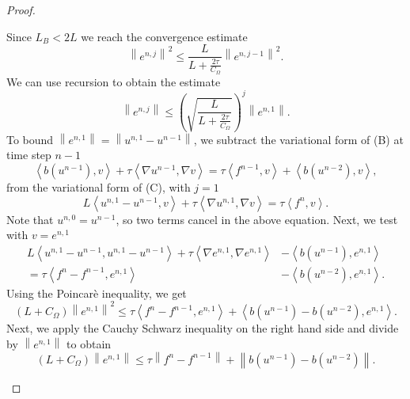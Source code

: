 \documentclass[../Main/main.tex]{subfiles}
\begin{document}
\begin{proof}
\begin{itemize}
		Since $L_B < 2L$ we reach the convergence estimate
		\begin{equation}
\left \|e^{n,j}\right \|^2 \leq \frac{L}{L+\frac{2\tau}{C_{\Omega}}}\left \|e^{n,j-1}\right \|^2.
		\end{equation}
		We can use recursion to obtain the estimate
		\begin{equation}\label{eq:recursion}
			\left \|e^{n,j}\right \| \leq \left(\sqrt{\frac{L}{L+\frac{2\tau}{C_{\Omega}}}} \right)^j  \left \|e^{n,1}\right \|.
		\end{equation}
		To bound $\left \|e^{n,1}\right \| = \left \|u^{n,1}-u^{n-1}\right \|$, we subtract the variational form of (B) at time step $n-1$
		\begin{equation}
			\left \langle b(u^{n-1}),v\right \rangle + \tau \left \langle \nabla u^{n-1},\nabla v \right \rangle =\tau \left \langle f^{n-1},v\right \rangle + \left \langle b(u^{n-2}),v\right\rangle,
		\end{equation}
		 from the variational form of (C), with $j=1$
		 \begin{equation}
		 	L\left \langle u^{n,1}-u^{n-1},v \right \rangle+\tau \left \langle \nabla u^{n,1},\nabla v \right\rangle = \tau\left \langle f^n,v\right\rangle.
		 \end{equation}
	 	Note that $u^{n,0}=u^{n-1}$, so two terms cancel in the above equation.
	  	Next, we test with $v=e^{n,1}$
		\begin{equation}
			\begin{aligned}
				L\left \langle u^{n,1}-u^{n-1},u^{n,1}-u^{n-1}\right \rangle + \tau \left \langle \nabla e^{n,1},\nabla e^{n,1}\right \rangle &- \left \langle b(u^{n-1}),e^{n,1}\right \rangle \\
				 =\tau \left \langle f^n-f^{n-1},e^{n,1}\right \rangle &- \left \langle b(u^{n-2}),e^{n,1}\right \rangle.
			\end{aligned}
			\end{equation}
		Using the Poincarè inequality, we get
		\begin{equation}
			(L+C_{\Omega})\left \|e^{n,1}\right \|^2 \leq \tau \left \langle f^n-f^{n-1},e^{n,1}\right \rangle + \left \langle b(u^{n-1})-b(u^{n-2}),e^{n,1}\right \rangle.
		\end{equation}
		Next, we apply the Cauchy Schwarz inequality on the right hand side and divide by $\left \|e^{n,1}\right \|$ to obtain
		\begin{equation}
			(L+C_{\Omega})\left \|e^{n,1}\right \| \leq \tau \left \| f^n-f^{n-1}\right \| + \left \| b(u^{n-1})-b(u^{n-2})\right \| .

\end{equation}
\end{itemize}
\end{proof}
\end{document}
